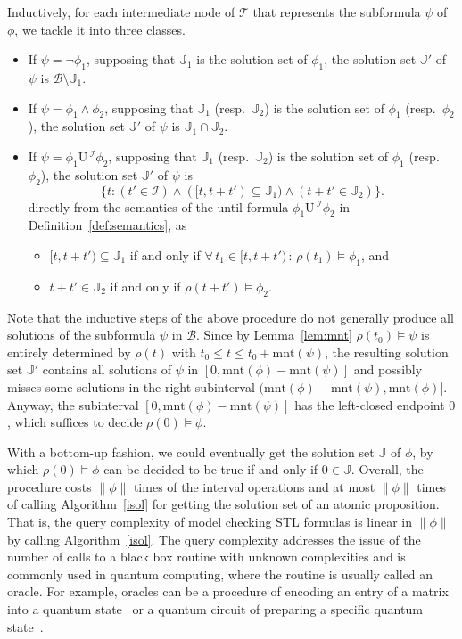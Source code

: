 \documentclass[a4paper,UKenglish,cleveref,autoref,thm-restate,authorcolumns]{lipics-v2019}
\newcommand{\I}{\mathcal{I}}
\newcommand{\JJ}{\mathbb{J}}
\newcommand{\ntl}{\mathrm{U}\,}
\newcommand{\mnt}{\mathrm{mnt}}
\begin{document}
Inductively, for each intermediate node of $\mathcal{T}$
that represents the subformula $\psi$ of $\phi$,
we tackle it into three classes.
\begin{itemize}
	\item If $\psi=\neg \phi_1$,
		supposing that $\JJ_1$ is the solution set of $\phi_1$,
		the solution set $\JJ'$ of $\psi$
		is $\mathcal{B} \setminus \JJ_1$.
	\item If $\psi=\phi_1 \wedge \phi_2$,
		supposing that $\JJ_1$ (resp.~$\JJ_2$) is the solution set of
		$\phi_1$ (resp.~$\phi_2$),
		the solution set $\JJ'$ of $\psi$ is $\JJ_1 \cap \JJ_2$.
	\item If $\psi=\phi_1 \ntl^\I \phi_2$,
		supposing that $\JJ_1$ (resp.~$\JJ_2$) is the solution set of
		$\phi_1$ (resp.~$\phi_2$),
		the solution set $\JJ'$ of $\psi$ is
		\[
		\{t : (t'\in\I) \wedge ([t,t+t') \subseteq \JJ_1 )\wedge (t+t'\in\JJ_2)\}.
		\]
		directly from the semantics of the until formula $\phi_1 \ntl^\I \phi_2$
		in Definition~\ref{def:semantics}, as
		\begin{itemize}
			\item $[t,t+t') \subseteq \JJ_1$
			if and only if $\forall\,t_1 \in [t,t+t') \,:\, \rho(t_1) \models \phi_1$, and 
			\item $t+t'\in\JJ_2$ if and only if $\rho(t+t') \models \phi_2$.
		\end{itemize}
    \end{itemize}
Note that the inductive steps of the above procedure
do not generally produce all solutions of the subformula $\psi$ in $\mathcal{B}$.
Since by Lemma~\ref{lem:mnt}
$\rho(t_0) \models \psi$ is entirely determined
by $\rho(t)$ with $t_0 \le t \le t_0+\mnt(\psi)$,
the resulting solution set $\JJ'$ contains all solutions of $\psi$ in $[0,\mnt(\phi)-\mnt(\psi)]$
and possibly misses some solutions in the right subinterval
$(\mnt(\phi)-\mnt(\psi),\mnt(\phi)]$.
Anyway, the subinterval $[0,\mnt(\phi)-\mnt(\psi)]$ has the left-closed endpoint $0$,
which suffices to decide $\rho(0) \models \phi$.

With a bottom-up fashion,
we could eventually get the solution set $\JJ$ of $\phi$,
by which $\rho(0) \models \phi$ can be decided to be true if and only if $0 \in \JJ$.
Overall, the procedure costs $\|\phi\|$ times of the interval operations
and at most $\|\phi\|$ times of calling Algorithm~\ref{isol}
for getting the solution set of an atomic proposition.
That is, the query complexity of model checking STL formulas is linear in $\|\phi\|$
by calling Algorithm~\ref{isol}.
The query complexity addresses the issue of the number of calls to a black box routine
with unknown complexities and is commonly used in quantum computing,
where the routine is usually called an oracle.
For example,
oracles can be a procedure of encoding an entry of a matrix into a quantum state~\cite{HHL09}
or a quantum circuit of preparing a specific quantum state~\cite{GWY21}.
\end{document}
